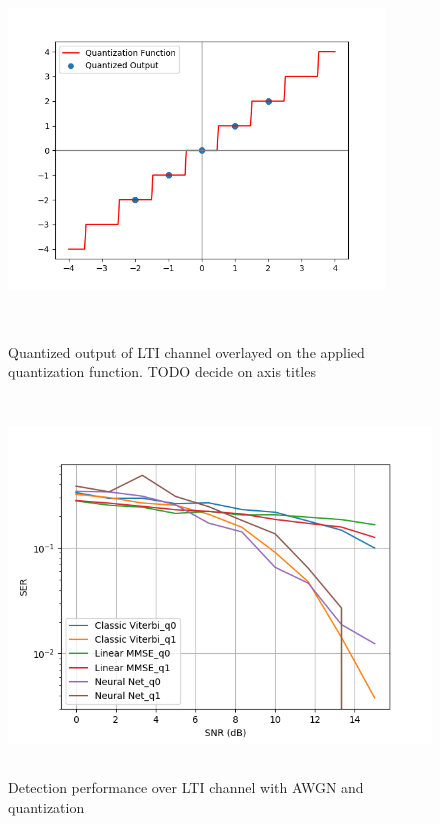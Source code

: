 \documentclass[12pt,a4paper]{report}
\begin{document}
\begin{figure}[H]
\centering
	\includegraphics[width=10cm,height = 10cm]{system_model/quantizer_overlay}
			  \caption{Quantized output of LTI channel overlayed on the applied quantization function. TODO decide on axis titles }
	  \label{fig:Quantized Overlay}
\end{figure}

\begin{figure}[H]
	\includegraphics[width=\textwidth,height = 10cm]{results/quantized_before_noise}
		  \caption{Detection performance over LTI channel with AWGN and quantization}
	  \label{fig:Quantized performance}
\end{figure}
\end{document}
